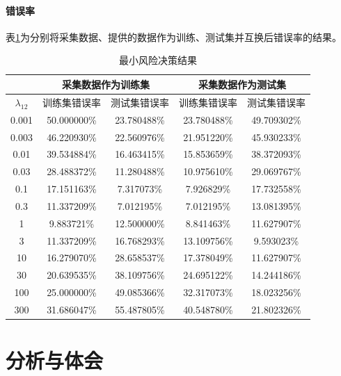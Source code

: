\paragraph{错误率} 表\ref{tab:minrisk}为分别将采集数据、提供的数据作为训练、测试集并互换后错误率的结果。
\begin{table}
	\centering
	\begin{tabular}{|c|c|c|c|c|}
		\hline
		& \multicolumn{2}{|c|}{采集数据作为训练集} & \multicolumn{2}{|c|}{采集数据作为测试集} \\
		\hline
		$\lambda_{12}$ & 训练集错误率 & 测试集错误率 & 训练集错误率 & 测试集错误率 \\
		\hline
		0.001 & 50.000000\% & 23.780488\% & 23.780488\% & 49.709302\% \\
		0.003 & 46.220930\% & 22.560976\% & 21.951220\% & 45.930233\% \\
		0.01 & 39.534884\% & 16.463415\% & 15.853659\% & 38.372093\% \\
		0.03 & 28.488372\% & 11.280488\% & 10.975610\% & 29.069767\% \\
		0.1 & 17.151163\% & 7.317073\% & 7.926829\% & 17.732558\% \\
		0.3 & 11.337209\% & 7.012195\% & 7.012195\% & 13.081395\% \\
		1 & 9.883721\% & 12.500000\% & 8.841463\% & 11.627907\% \\
		3 & 11.337209\% & 16.768293\% & 13.109756\% & 9.593023\% \\
		10 & 16.279070\% & 28.658537\% & 17.378049\% & 11.627907\% \\
		30 & 20.639535\% & 38.109756\% & 24.695122\% & 14.244186\% \\
		100 & 25.000000\% & 49.085366\% & 32.317073\% & 18.023256\% \\
		300 & 31.686047\% & 55.487805\% & 40.548780\% & 21.802326\% \\
		\hline
	\end{tabular}
	\caption{最小风险决策结果}
	\label{tab:minrisk}
\end{table}
\section{分析与体会}



